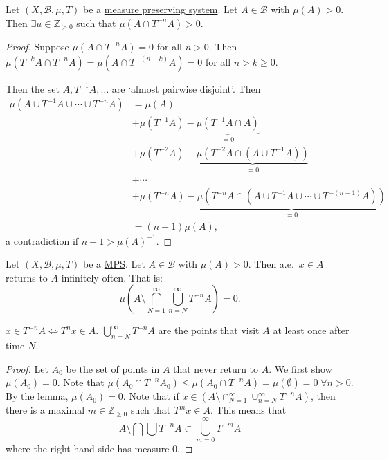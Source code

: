 \documentclass{article}
\begin{document}
\begin{lemma}
  Let $(X, \mathcal{B}, \mu, T)$ be a \hyperlink{def:mps}{measure preserving system}. Let $A \in \mathcal{B}$ with $\mu(A) > 0$. Then $\exists u \in \mathbb{Z}_{> 0}$ such that $\mu(A \cap T^{-n} A) > 0$.
\end{lemma}
\begin{proof}
  Suppose $\mu(A \cap T^{-n}A) = 0$ for all $n > 0$.
  Then $\mu(T^{-k}A \cap T^{-n} A) = \mu(A \cap T^{-(n-k)}A) = 0$ for all $n > k \geq 0$.

  Then the set $A, T^{-1} A, \dotsc$ are `almost pairwise disjoint'.
  Then
  \begin{align*}
    \mu(A \cup T^{-1} A \cup \dotsb \cup T^{-n} A) &= \mu(A) \\
                                                   &+ \mu(T^{-1} A) - \underbrace{\mu(T^{-1}A \cap A)}_{=0} \\
                                                   &+ \mu(T^{-2} A) - \underbrace{\mu(T^{-2} A \cap (A \cup T^{-1} A))}_{=0} \\
                                                   &+ \dotsb \\
                                                   &+ \mu(T^{-n} A) - \underbrace{\mu(T^{-n} A \cap (A \cup T^{-1} A \cup \dotsb \cup T^{-(n-1)} A))}_{=0} \\
                                                   &= (n+1) \mu(A),
  \end{align*}
  a contradiction if $n + 1 > \mu(A)^{-1}$.
\end{proof}
\begin{thm}
  Let $(X, \mathcal{B}, \mu, T)$ be a \hyperlink{def:mps}{MPS}. Let $A \in \mathcal{B}$ with $\mu(A) > 0$. Then a.e.\ $x \in A$ returns to $A$ infinitely often.
  That is:
  \begin{equation*}
    \mu(A \setminus \bigcap_{N=1}^\infty \bigcup_{n=N}^\infty T^{-n} A) = 0.
  \end{equation*}
\end{thm}
\begin{remark}
  $x \in T^{-n} A \iff T^n x \in A$. $\bigcup_{n=N}^\infty T^{-n} A$ are the points that visit $A$ at least once after time $N$.
\end{remark}
\begin{proof}
  Let $A_0$ be the set of points in $A$ that never return to $A$. We first show $\mu(A_0) = 0$. Note that $\mu(A_0 \cap T^{-n} A_0) \leq \mu(A_0 \cap T^{-n} A) = \mu(\emptyset) = 0 \; \forall n > 0$.
  By the lemma, $\mu(A_0) = 0$. Note that if $x \in (A \setminus \cap_{N=1}^\infty \cup_{n=N}^\infty T^{-n} A)$, then there is a maximal $m \in \mathbb{Z}_{\geq 0}$ such that $T^m x \in A$.
  This means that
  \begin{equation*}
    A \setminus \bigcap \bigcup T^{-n} A \subset \bigcup_{m=0}^\infty T^{-m} A
  \end{equation*}
  where the right hand side has measure 0.
\end{proof}
\end{document}
